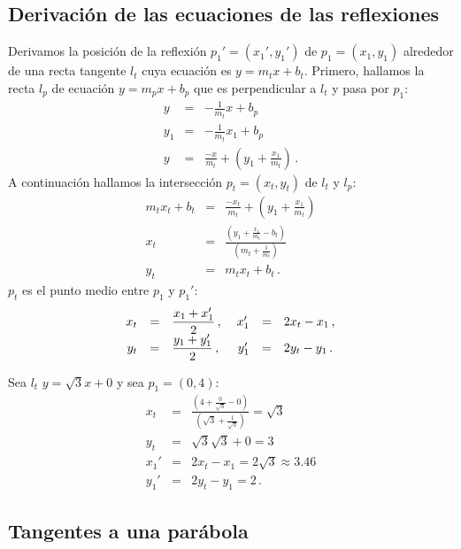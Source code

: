 
\subsection{Derivación de las ecuaciones de las reflexiones}

Derivamos la posición de la reflexión $p_1'=(x_1',y_1')$ de $p_1=(x_1,y_1)$ alrededor de una recta tangente $l_t$ cuya ecuación es $y=m_tx+b_t$. Primero, hallamos la recta $l_p$ de ecuación $y=m_px+b_p$ que es perpendicular a $l_t$ y pasa por $p_1$:
\begin{eqnarray*}
y&=&-\frac{1}{m_t}x+b_p\\
y_1&=&-\frac{1}{m_t}x_1+b_p\\
y&=&\frac{-x}{m_t}+\left(y_1+\frac{x_1}{m_t}\right)\,.
\end{eqnarray*}
A continuación hallamos la intersección $p_t=(x_t,y_t)$ de $l_t$ y $l_p$:
\begin{eqnarray*}
m_tx_t+b_t&=&\frac{-x_t}{m_t}+\left(y_1+\frac{x_1}{m_t}\right)\\
x_t&=&\frac{\left(y_1+\displaystyle\frac{x_1}{m_t}-b_t\right)}{\left(m_t+\displaystyle\frac{1}{m_t}\right)}\\
y_t&=&m_tx_t+b_t\,.
\end{eqnarray*}
$p_t$ es el punto medio entre $p_1$ y $p_1'$:
\[
\begin{array}{rcl@{\hspace{3ex}}rcl}
x_t&=&\displaystyle\frac{x_1+x_1'}{2}\,, &x_1'&=&2x_t-x_1\,,\\
y_t&=&\displaystyle\frac{y_1+y_1'}{2}\,,& y_1'&=&2y_t-y_1\,.
\end{array}
\]
\begin{example}
Sea $l_t$ $y=\sqrt{3}x+0$ y sea $p_1=(0,4)$:
\begin{eqnarray*}
x_t&=&\frac{\left(4+\displaystyle\frac{0}{\sqrt{3}}-0\right)}{\left(\sqrt{3}+\displaystyle\frac{1}{\sqrt{3}}\right)}=\sqrt{3}\\
y_t&=&\sqrt{3}\sqrt{3}+0=3\\
x_1'&=&2x_t-x_1=2\sqrt{3}\approx 3.46\\
y_1'&=&2y_t-y_1= 2\,.
\end{eqnarray*}
\end{example}


\subsection{Tangentes a una parábola}\label{s.parabola}

